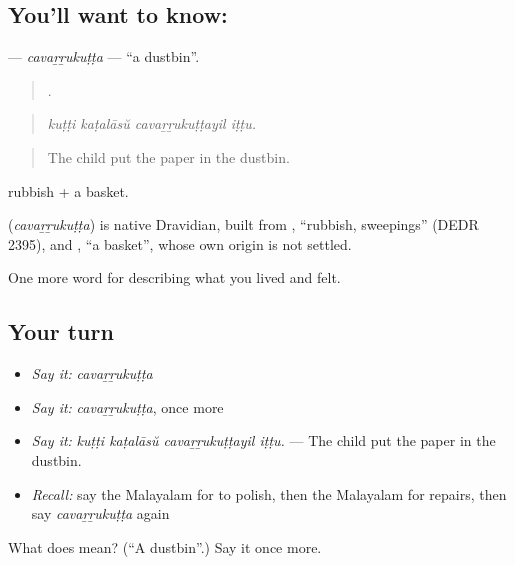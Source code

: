 \subsection*{You'll want to know: }
\textbf{} — \emph{cavaṟṟukuṭṭa} — \textquotedblleft{}a dustbin\textquotedblright{}.

\begin{quote}
   .
\end{quote}

\begin{quote}
\emph{kuṭṭi kaṭalāsŭ cavaṟṟukuṭṭayil iṭṭu.}
\end{quote}

\begin{quote}
The child put the paper in the dustbin.
\end{quote}

 rubbish +  a basket.

\begin{cousinweb}
\textbf{} (\emph{cavaṟṟukuṭṭa}) is native Dravidian, built from , \textquotedblleft{}rubbish, sweepings\textquotedblright{} (DEDR 2395), and , \textquotedblleft{}a basket\textquotedblright{}, whose own origin is not settled.
\end{cousinweb}

\begin{grammarlens}[title={What you've built}]
One more word for describing what you lived and felt.
\end{grammarlens}

\subsection*{Your turn}
\begin{itemize}
\raggedright
  \item \emph{Say it:} \emph{cavaṟṟukuṭṭa}
  \item \emph{Say it:} \emph{cavaṟṟukuṭṭa}, once more
  \item \emph{Say it:} \emph{kuṭṭi kaṭalāsŭ cavaṟṟukuṭṭayil iṭṭu.} — The child put the paper in the dustbin.
  \item \emph{Recall:} say the Malayalam for to polish, then the Malayalam for repairs, then say \emph{cavaṟṟukuṭṭa} again
\end{itemize}

\begin{tcolorbox}[breakable,colback=teal!4,colframe=teal!35!black,title={Before you move on}]
What does  mean? (\textquotedblleft{}A dustbin\textquotedblright{}.) Say it once more.
\end{tcolorbox}
